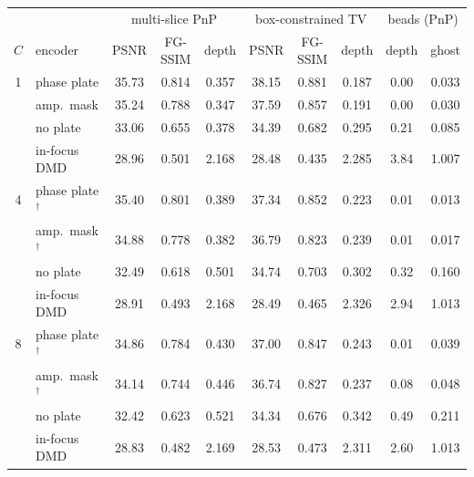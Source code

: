 \begin{tabular}{@{}cl ccc ccc cc@{}}\toprule
 & & \multicolumn{3}{c}{multi-slice PnP} & \multicolumn{3}{c}{box-constrained TV} & \multicolumn{2}{c}{beads (PnP)}\\
\cmidrule(lr){3-5}\cmidrule(lr){6-8}\cmidrule(l){9-10}
$C$ & encoder & PSNR & FG-SSIM & depth & PSNR & FG-SSIM & depth & depth & ghost\\\midrule
1 & phase plate & 35.73 & 0.814 & 0.357 & 38.15 & 0.881 & 0.187 & 0.00 & 0.033\\
 & amp.\ mask & 35.24 & 0.788 & 0.347 & 37.59 & 0.857 & 0.191 & 0.00 & 0.030\\
 & no plate & 33.06 & 0.655 & 0.378 & 34.39 & 0.682 & 0.295 & 0.21 & 0.085\\
 & in-focus DMD & 28.96 & 0.501 & 2.168 & 28.48 & 0.435 & 2.285 & 3.84 & 1.007\\
\midrule
4 & phase plate$^\dagger$ & 35.40 & 0.801 & 0.389 & 37.34 & 0.852 & 0.223 & 0.01 & 0.013\\
 & amp.\ mask$^\dagger$ & 34.88 & 0.778 & 0.382 & 36.79 & 0.823 & 0.239 & 0.01 & 0.017\\
 & no plate & 32.49 & 0.618 & 0.501 & 34.74 & 0.703 & 0.302 & 0.32 & 0.160\\
 & in-focus DMD & 28.91 & 0.493 & 2.168 & 28.49 & 0.465 & 2.326 & 2.94 & 1.013\\
\midrule
8 & phase plate$^\dagger$ & 34.86 & 0.784 & 0.430 & 37.00 & 0.847 & 0.243 & 0.01 & 0.039\\
 & amp.\ mask$^\dagger$ & 34.14 & 0.744 & 0.446 & 36.74 & 0.827 & 0.237 & 0.08 & 0.048\\
 & no plate & 32.42 & 0.623 & 0.521 & 34.34 & 0.676 & 0.342 & 0.49 & 0.211\\
 & in-focus DMD & 28.83 & 0.482 & 2.169 & 28.53 & 0.473 & 2.311 & 2.60 & 1.013\\
\bottomrule\end{tabular}
